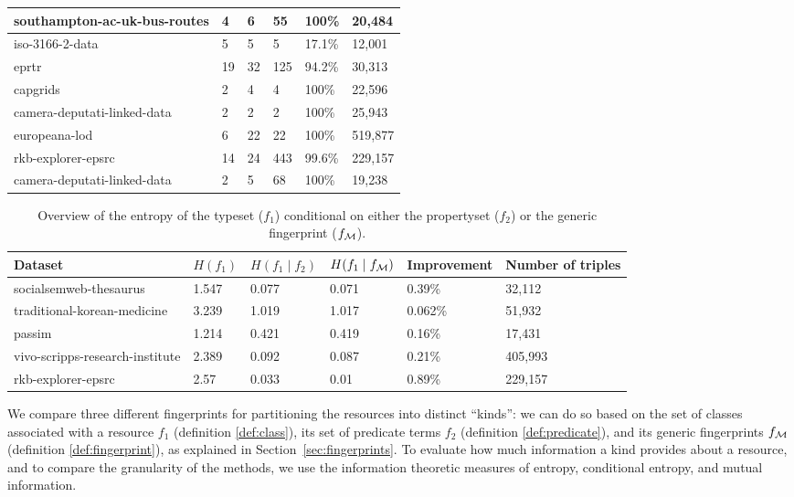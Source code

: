 \begin{table*}[ht!]
\begin{tabular}{|l|l|l|l|l|l|}
    \hline
    southampton-ac-uk-bus-routes & 4 & 6 & 55 & 100\% & 20,484 \\
    \hline
    iso-3166-2-data & 5 & 5 & 5 & 17.1\% & 12,001 \\
    \hline
    eprtr & 19 & 32 & 125 & 94.2\% & 30,313 \\
    \hline
    capgrids & 2 & 4 & 4 & 100\% & 22,596 \\
    \hline
    camera-deputati-linked-data & 2 & 2 & 2 & 100\% & 25,943 \\
    \hline
    europeana-lod & 6 & 22 & 22 & 100\% & 519,877 \\
    \hline
    rkb-explorer-epsrc & 14 & 24 & 443 & 99.6\% & 229,157 \\
    \hline
    camera-deputati-linked-data & 2 & 5 & 68 & 100\% & 19,238 \\
    \hline
  \end{tabular}
\end{table*}

\begin{table*}[ht!]
  \label{tab:mutual_information}
  \centering
  \caption{
    Overview of the entropy of the typeset ($f_1$) conditional on
    either the propertyset ($f_2$) or the generic fingerprint ($f_{\mathcal M}$).
  }
  \begin{tabular}{|l|l|l|l|l|l|}
    \hline
    \textbf{Dataset} & \textbf{$H(f_1)$} & \textbf{$H(f_1 \mid f_2)$} & \textbf{$H(f_1 \mid f_{\mathcal M})$} & \textbf{Improvement} & \textbf{Number of triples}\\
    \hline
    \hline
    socialsemweb-thesaurus & 1.547 & 0.077 & 0.071 & 0.39\% & 32,112 \\
    \hline
    traditional-korean-medicine & 3.239 & 1.019 & 1.017 & 0.062\% & 51,932 \\
    \hline
    passim & 1.214 & 0.421 & 0.419 & 0.16\% & 17,431 \\
    \hline
    vivo-scripps-research-institute & 2.389 & 0.092 & 0.087 & 0.21\% & 405,993 \\
    \hline
    rkb-explorer-epsrc & 2.57 & 0.033 & 0.01 & 0.89\% & 229,157 \\
    \hline
  \end{tabular}
\end{table*}

We compare three different fingerprints for partitioning the resources
 into distinct ``kinds'': we can do so based on the set of classes
 associated with a resource $f_1$ (definition \ref{def:class}),
 its set of predicate terms $f_2$ (definition \ref{def:predicate}),
 and its generic fingerprints $f_{\mathcal M}$ (definition \ref{def:fingerprint}),
 as explained in Section~\ref{sec:fingerprints}.
To evaluate how much information a kind provides about a resource,
 and to compare the granularity of the methods,
 we use the information theoretic measures of entropy,
 conditional entropy, and mutual information.

